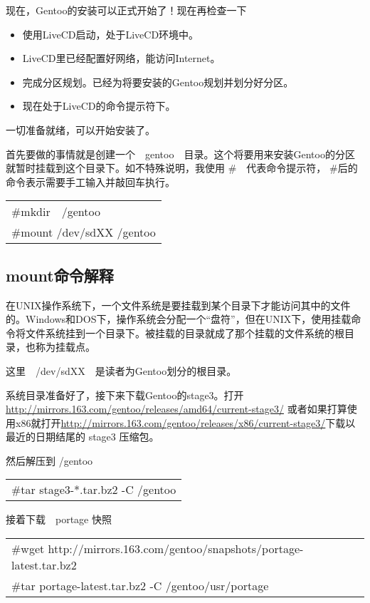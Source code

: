 \documentclass[amstex,twoside]{ctexbook}
\newenvironment{insertnote}{ \ttfamily\CJKfamily{KaiTi} }{\vskip 0.5cm }
\newenvironment{code}{\small\tt\begin{longtable}{p{0.8\textwidth}}}{\end{longtable}}
\begin{document}
现在，Gentoo的安装可以正式开始了！现在再检查一下

\begin{itemize}
\item	使用LiveCD启动，处于LiveCD环境中。
\item	LiveCD里已经配置好网络，能访问Internet。
\item	完成分区规划。已经为将要安装的Gentoo规划并划分好分区。
\item	现在处于LiveCD的命令提示符下。
\end{itemize}

一切准备就绪，可以开始安装了。

首先要做的事情就是创建一个　gentoo　目录。这个将要用来安装Gentoo的分区就暂时挂载到这个目录下。如不特殊说明，我使用 \#　代表命令提示符， \#后的命令表示需要手工输入并敲回车执行。

\begin{code}
\#mkdir　/gentoo\\
\#mount /dev/sdXX /gentoo
\end{code}

\begin{insertnote}
\subsection*{mount命令解释}

在UNIX操作系统下，一个文件系统是要挂载到某个目录下才能访问其中的文件的。Windows和DOS下，操作系统会分配一个“盘符”，但在UNIX下，使用挂载命令将文件系统挂到一个目录下。被挂载的目录就成了那个挂载的文件系统的根目录，也称为挂载点。

\end{insertnote}

这里　/dev/sdXX　是读者为Gentoo划分的根目录。

系统目录准备好了，接下来下载Gentoo的stage3。打开　\url{http://mirrors.163.com/gentoo/releases/amd64/current-stage3/} 或者如果打算使用x86就打开\url{http://mirrors.163.com/gentoo/releases/x86/current-stage3/}下载以最近的日期结尾的 stage3 压缩包。

然后解压到 /gentoo
\begin{code}
\#tar stage3-*.tar.bz2 -C /gentoo 
\end{code}

接着下载　portage 快照
\begin{code}
\#wget http://mirrors.163.com/gentoo/snapshots/portage-latest.tar.bz2\\
\#tar portage-latest.tar.bz2 -C /gentoo/usr/portage
\end{code}
\end{document}
